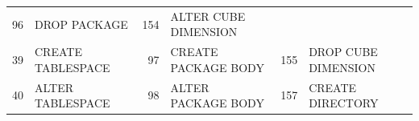 \begin{appendix}
\begin{longtable}[]{@{}rl|rl|rl@{}}
\begin{minipage}[t]{0.06\columnwidth}
96\strut
\end{minipage} & \begin{minipage}[t]{0.24\columnwidth}\raggedright\strut
DROP PACKAGE\strut
\end{minipage} & \begin{minipage}[t]{0.06\columnwidth}\raggedright\strut
154\strut
\end{minipage} & \begin{minipage}[t]{0.24\columnwidth}\raggedright\strut
ALTER CUBE DIMENSION\strut
\end{minipage}\tabularnewline
\begin{minipage}[t]{0.06\columnwidth}\raggedright\strut
39\strut
\end{minipage} & \begin{minipage}[t]{0.19\columnwidth}\raggedright\strut
CREATE TABLESPACE\strut
\end{minipage} & \begin{minipage}[t]{0.06\columnwidth}\raggedright\strut
97\strut
\end{minipage} & \begin{minipage}[t]{0.24\columnwidth}\raggedright\strut
CREATE PACKAGE BODY\strut
\end{minipage} & \begin{minipage}[t]{0.06\columnwidth}\raggedright\strut
155\strut
\end{minipage} & \begin{minipage}[t]{0.24\columnwidth}\raggedright\strut
DROP CUBE DIMENSION\strut
\end{minipage}\tabularnewline
\begin{minipage}[t]{0.06\columnwidth}\raggedright\strut
40\strut
\end{minipage} & \begin{minipage}[t]{0.19\columnwidth}\raggedright\strut
ALTER TABLESPACE\strut
\end{minipage} & \begin{minipage}[t]{0.06\columnwidth}\raggedright\strut
98\strut
\end{minipage} & \begin{minipage}[t]{0.24\columnwidth}\raggedright\strut
ALTER PACKAGE BODY\strut
\end{minipage} & \begin{minipage}[t]{0.06\columnwidth}\raggedright\strut
157\strut
\end{minipage} & \begin{minipage}[t]{0.24\columnwidth}\raggedright\strut
CREATE DIRECTORY\strut
\end{minipage}\tabularnewline

\end{longtable}
\end{appendix}
